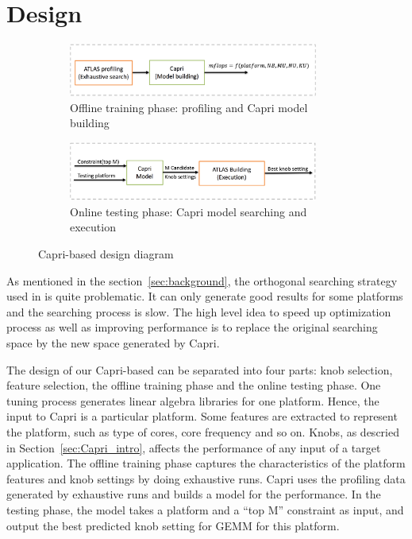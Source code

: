 \section{Design}
\label{sec:design}

\begin{figure}[tbhp]
  \centering
  \begin{subfigure}[b]{1.0\linewidth}
    \centering
    \includegraphics[width=0.9\textwidth]{images/offline_training.png}
    \caption{Offline training phase: \atl profiling and Capri model building}
    \label{fig:design_train}
  \end{subfigure}
  \begin{subfigure}[b]{1.0\linewidth}
    \centering
    \includegraphics[width=0.9\textwidth]{images/testing.png}
    \caption{Online testing phase: Capri model searching and \atl execution}
    \label{fig:design_test}
  \end{subfigure}
  \caption{Capri-based \atl design diagram}
\end{figure}

As mentioned in the section~\ref{sec:background}, the orthogonal searching
strategy used in
\atl is quite problematic. It can only generate good results for some platforms
and the searching process is slow. The high level idea to speed up \atl
optimization process as well as improving \gem performance is to replace the
original searching space by the new space generated by Capri.

The design of our Capri-based \atl can be separated into four parts: knob
selection, feature selection, the offline training phase and the online testing
phase. One \atl tuning process generates linear algebra libraries for one
platform. Hence, the input to Capri is a particular platform. Some features are
extracted to represent the platform, such as type of cores, core frequency and
so on. Knobs, as descried in Section~\ref{sec:Capri_intro}, affects the
performance of any input of a target application. The offline training phase
captures the characteristics of the platform features and knob settings by doing
exhaustive runs. Capri uses the profiling data generated by exhaustive runs and
builds a model for the \gem performance. In the testing phase, the model takes
a platform and a ``top M'' constraint as input, and output the best predicted
knob setting for GEMM for this platform.

